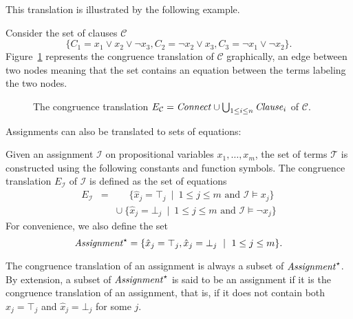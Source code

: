 \documentclass[smallextended]{svjour3}
\begin{document}
\noindent This translation is illustrated by the following example.

\begin{example}\label{ex:np1}
Consider the set of clauses $\mathcal{C}$
\begin{equation*}
\big\{C_1 = x_1 \vee x_2 \vee \neg x_3, C_2 = \neg x_2 \vee x_3, C_3 = \neg x_1 \vee \neg x_2\big\}.
\end{equation*}
Figure~\ref{fig:npexamplebig} represents the congruence translation of
$\mathcal{C}$ graphically, an edge between two nodes meaning that the set
contains an equation between the terms labeling the two nodes.

\begin{figure}[htb]

\caption{The congruence translation $E_{\mathcal{C}} = {\it Connect} \cup \bigcup_{1 \leq i \leq n}{\it Clause}_i$ of $\mathcal{C}$.}
\label{fig:npexamplebig}
\end{figure}

\end{example}

Assignments can also be translated to sets of equations:
\begin{definition}
Given an assignment $\mathcal{I}$ on propositional variables $x_1,\ldots,x_m$, the set of terms $\mathcal{T}$ is constructed using the following constants and function symbols.
The congruence translation $E_{\mathcal{I}}$ of $\mathcal{I}$ is defined as the set of equations
\begin{eqnarray*}
  E_{\mathcal{I}} & = & \phantom{\cup}\ \{ \hat{x}_j = \top_j \ \mid\  1 \leq j \leq m \text{ and } \mathcal{I} \models x_j \} \\
               &   & \cup\ \{ \hat{x}_j = \bot_j \ \mid\ 1 \leq j \leq m \text{ and } \mathcal{I} \models \neg x_j \}
\end{eqnarray*}
For convenience, we also define the set
\begin{equation*}
  {\it Assignment}^\star = \{ \hat{x}_j = \top_j, \hat{x}_j = \bot_j \ \mid\ 1 \leq j \leq m\}.
\end{equation*}
\end{definition}
\noindent
The congruence translation of an assignment is always a subset of
${\it Assignment}^\star$.  By extension, a subset of ${\it Assignment}^\star$ is
said to be an assignment if it is the congruence translation of an assignment,
that is, if it does not contain both $\hat{x}_j = \top_j$ and $\hat{x}_j =
\bot_j$ for some $j$.
\end{document}
